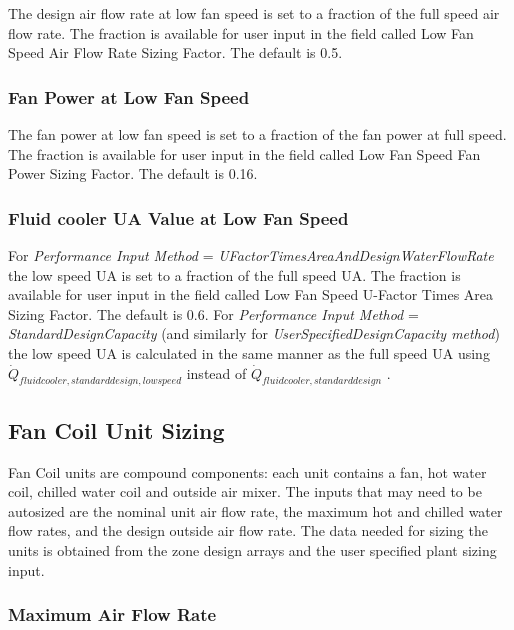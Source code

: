 The design air flow rate at low fan speed is set to a fraction of the full speed air flow rate. The fraction is available for user input in the field called Low Fan Speed Air Flow Rate Sizing Factor. The default is 0.5.

\subsubsection{Fan Power at Low Fan Speed}\label{fan-power-at-low-fan-speed-2}

The fan power at low fan speed is set to a fraction of the fan power at full speed. The fraction is available for user input in the field called Low Fan Speed Fan Power Sizing Factor. The default is 0.16.

\subsubsection{Fluid cooler UA Value at Low Fan Speed}\label{fluid-cooler-ua-value-at-low-fan-speed-1}

For \emph{Performance Input Method} = \emph{UFactorTimesAreaAndDesignWaterFlowRate} the low speed UA is set to a fraction of the full speed UA. The fraction is available for user input in the field called Low Fan Speed U-Factor Times Area Sizing Factor. The default is 0.6. For \emph{Performance Input Method} = \emph{StandardDesignCapacity} (and similarly for \emph{UserSpecifiedDesignCapacity method}) the low speed UA is calculated in the same manner as the full speed UA using \({\dot Q_{fluidcooler,standarddesign,lowspeed}}\) instead of \({\dot Q_{fluidcooler,standarddesign}}\) .

\subsection{Fan Coil Unit Sizing}\label{fan-coil-unit-sizing}

Fan Coil units are compound components: each unit contains a fan, hot water coil, chilled water coil and outside air mixer. The inputs that may need to be autosized are the nominal unit air flow rate, the maximum hot and chilled water flow rates, and the design outside air flow rate. The data needed for sizing the units is obtained from the zone design arrays and the user specified plant sizing input.

\subsubsection{Maximum Air Flow Rate}\label{maximum-air-flow-rate}

